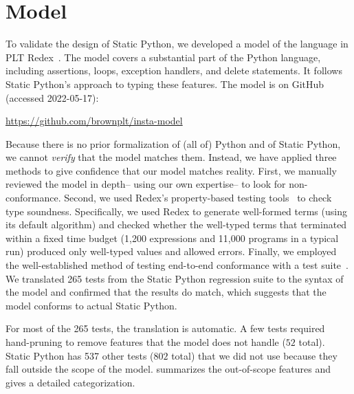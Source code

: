 \documentclass[english,cleveref,crc]{programming}
\newcommand{\SP}{Static Python}
\newcommand{\totalnum}[1]{$#1$ total}
\newcommand{\numSPtest}{265}
\newcommand{\numSPtotal}{802} %
\newcommand{\numSPdiff}{537} %
\begin{document}
\section{Model}
\label{s:model}

To validate the design of \SP{}, we developed a model of the language in PLT
Redex~\cite{kcdeffmrtf-popl-2012}.
The model covers a substantial part of the Python language, including
assertions, loops, exception handlers, and delete statements.
It follows \SP{}'s approach to typing these features.
The model is on GitHub (accessed 2022-05-17):
\begin{center}
  \url{https://github.com/brownplt/insta-model}
\end{center}
Because there is no prior formalization of (all of) Python and of \SP{}, we cannot
\emph{verify} that the model matches them. Instead, we have applied
three methods to give confidence that our model matches reality.
First, we manually reviewed the model in depth\--- using our
own expertise\--- to look for non-conformance.  Second, 
we used Redex's property-based testing tools~\cite{kf-sfp-2009} to check
type soundness.
Specifically, we used Redex to generate well-formed terms (using its default
algorithm) and checked whether the well-typed terms that terminated within a
fixed time budget (1,200 expressions and 11,000 programs in a typical run)
produced only well-typed values and allowed errors.
Finally, we employed the well-established method of testing end-to-end
conformance with a test suite~\cite{gsk-ecoop-2010,gclpk-dls-2012,pmmwplck-oopsla-2013,bcfgmnss-popl-2014,fgpssmds-popl-2016}.
We translated \numSPtest{} tests from the \SP{} regression suite to the
syntax of the model and confirmed that the results
do match,
which suggests that the model conforms to actual \SP{}.

For most of the \numSPtest{} tests, the translation is automatic.
A few tests required hand-pruning to remove features that the model does not
handle (\totalnum{52}).
\SP{} has \numSPdiff{} other tests (\totalnum{\numSPtotal{}}) that we did not
use because they fall outside the scope of the model.
 summarizes the out-of-scope features and  gives
a detailed categorization.

\end{document}

